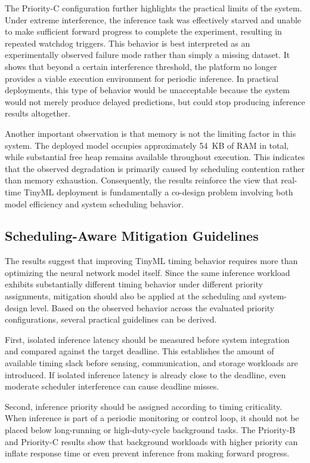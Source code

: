 \documentclass[conference]{IEEEtran}
\begin{document}
The Priority-C configuration further highlights the practical limits of the system. Under extreme interference, the inference task was effectively starved and unable to make sufficient forward progress to complete the experiment, resulting in repeated watchdog triggers. This behavior is best interpreted as an experimentally observed failure mode rather than simply a missing dataset. It shows that beyond a certain interference threshold, the platform no longer provides a viable execution environment for periodic inference. In practical deployments, this type of behavior would be unacceptable because the system would not merely produce delayed predictions, but could stop producing inference results altogether.

Another important observation is that memory is not the limiting factor in this system. The deployed model occupies approximately 54~KB of RAM in total, while substantial free heap remains available throughout execution. This indicates that the observed degradation is primarily caused by scheduling contention rather than memory exhaustion. Consequently, the results reinforce the view that real-time TinyML deployment is fundamentally a co-design problem involving both model efficiency and system scheduling behavior.

\subsection{Scheduling-Aware Mitigation Guidelines}
\label{subsec:scheduling_mitigation}

The results suggest that improving TinyML timing behavior requires more than optimizing the neural network model itself. Since the same inference workload exhibits substantially different timing behavior under different priority assignments, mitigation should also be applied at the scheduling and system-design level. Based on the observed behavior across the evaluated priority configurations, several practical guidelines can be derived.

First, isolated inference latency should be measured before system integration and compared against the target deadline. This establishes the amount of available timing slack before sensing, communication, and storage workloads are introduced. If isolated inference latency is already close to the deadline, even moderate scheduler interference can cause deadline misses.

Second, inference priority should be assigned according to timing criticality. When inference is part of a periodic monitoring or control loop, it should not be placed below long-running or high-duty-cycle background tasks. The Priority-B and Priority-C results show that background workloads with higher priority can inflate response time or even prevent inference from making forward progress.
\end{document}
